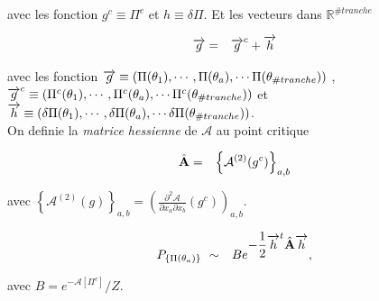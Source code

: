 avec les fonction   $g^c \equiv \Pi^c$ et $h \equiv \delta \Pi$. Et les vecteurs dans $\mathbb{R}^{\# tranche}$

\begin{eqnarray*}
	\mathbf{\overrightarrow{g}} & = & \mathbf{\overrightarrow{g}}^c + \mathbf{\overrightarrow{h}} 	
\end{eqnarray*}

avec les fonction $\mathbf{\overrightarrow{g}} \equiv (\Pi(\theta_1), \cdots , \Pi(\theta_a) , \cdots \Pi(\theta_{\# tranche} )) $ ,  $\mathbf{\overrightarrow{g}}^c \equiv (\Pi^c(\theta_1), \cdots , \Pi^c(\theta_a) , \cdots \Pi^c(\theta_{\# tranche} ))$ et $\mathbf{\overrightarrow{h}} \equiv  (\delta\Pi(\theta_1), \cdots , \delta\Pi(\theta_a) , \cdots \delta\Pi(\theta_{\# tranche} ))$.\\
	
On definie la {\em matrice hessienne} de $\mathcal{A}$ au point critique

\begin{eqnarray*}
	\hat{\mathbf{A}}  & = & \left \{ \mathcal{A}^{(2)} (g^c)\right \}_{a,b}
\end{eqnarray*} 

 avec  $\left \{ \mathcal{A}^{(2)} (g)\right \}_{a,b} = \left (\frac{\partial^2 \mathcal{A}}{\partial x_a \partial x_b}(g^c) \right )_{a,b}$.

	
\begin{eqnarray}
	P_{\{ \Pi(\theta_a) \}} & 	\sim & B e^{\displaystyle -\frac{1}{2} \vect{h}^t \operator{A} \vect{h}}, 
\end{eqnarray}
	
avec $ B = e^{-\mathcal{A}[ \Pi^c]}/Z $.
	
